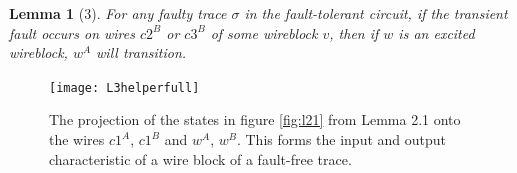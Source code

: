 \documentclass[12pt]{report}
\newtheorem*{lemma}{Lemma}
\begin{document}

\begin{lemma}[3]
For any faulty trace $\sigma$ in the fault-tolerant circuit, if the transient fault occurs on wires $c2^B$ or $c3^B$ of some wireblock $v$, then if $w$ is an excited wireblock, $w^A$ will transition.

\end{lemma}
\begin{figure}
\centering
\texttt{[image: L3helperfull]}
\caption{The projection of the states in figure \ref{fig:l21} from Lemma 2.1 onto the wires $c1^A$, $c1^B$ and $w^A$, $w^B$. This forms the input and output characteristic of a wire block of a fault-free trace.}
\label{fig:l3helper}
\end{figure}
\end{document}
